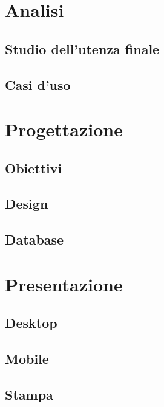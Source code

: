 \documentclass[a4paper, dvipsnames, table]{article}
\begin{document}
\newpage
\section{Analisi}
	\subsection{Studio dell'utenza finale}
		
	\subsection{Casi d'uso}
		

\newpage
\section{Progettazione}%
	\subsection{Obiettivi}
		
	\subsection{Design}%
		
	\subsection{Database}
		

\newpage
\section{Presentazione}%
	\subsection{Desktop}
		
	\subsection{Mobile}
		
	\subsection{Stampa}
		
\end{document}
